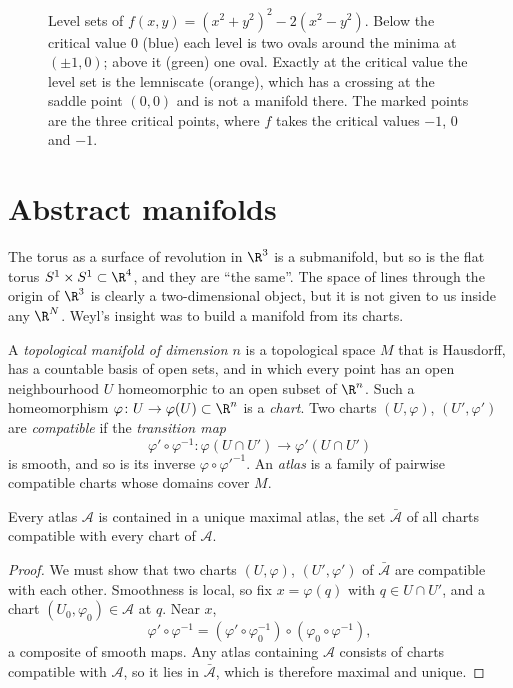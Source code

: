 \begin{figure}[ht]
\centering
{}
\caption{Level sets of $f(x,y)=(x^2+y^2)^2-2(x^2-y^2)$. Below the critical value $0$ (blue) each level is two ovals around the minima at $(\pm1,0)$; above
it (green) one oval. Exactly at the critical value the level set is the lemniscate (orange), which has a crossing at the saddle point $(0,0)$ and is not
a manifold there. The marked points are the three critical points, where $f$ takes the critical values $-1$, $0$ and $-1$.}
\label{fig:cassini}
\end{figure}

\section{Abstract manifolds}\label{sec:abstract}

The torus as a surface of revolution in $\R^3$ is a submanifold, but so is the flat torus $S^1\times S^1\subset\R^4$, and they are ``the same''. The
space of lines through the origin of $\R^3$ is clearly a two-dimensional object, but it is not given to us inside any $\R^N$. Weyl's insight was to
build a manifold from its charts.

\begin{definition}
A \emph{topological manifold of dimension $n$} is a topological space $M$ that is Hausdorff, has a countable basis of open sets, and in which every point
has an open neighbourhood $U$ homeomorphic to an open subset of $\R^n$. Such a homeomorphism $\varphi\colon U\to\varphi(U)\subset\R^n$ is a
\emph{chart}. Two charts $(U,\varphi)$, $(U',\varphi')$ are \emph{compatible} if the \emph{transition map}
\[
\varphi'\circ\varphi^{-1}\colon\varphi(U\cap U')\to\varphi'(U\cap U')
\]
is smooth, and so is its inverse $\varphi\circ\varphi'^{-1}$. An \emph{atlas} is a family of pairwise compatible charts whose domains cover $M$.
\end{definition}

\begin{proposition}\label{prop:maxatlas}
Every atlas $\mathcal A$ is contained in a unique maximal atlas, the set $\bar{\mathcal A}$ of all charts compatible with every chart of $\mathcal A$.
\end{proposition}
\begin{proof}
We must show that two charts $(U,\varphi)$, $(U',\varphi')$ of $\bar{\mathcal A}$ are compatible with each other. Smoothness is local, so fix
$x=\varphi(q)$ with $q\in U\cap U'$, and a chart $(U_0,\varphi_0)\in\mathcal A$ at $q$. Near $x$,
\[
\varphi'\circ\varphi^{-1}=(\varphi'\circ\varphi_0^{-1})\circ(\varphi_0\circ\varphi^{-1}),
\]
a composite of smooth maps. Any atlas containing $\mathcal A$ consists of charts compatible with $\mathcal A$, so it lies in $\bar{\mathcal A}$, which
is therefore maximal and unique.
\end{proof}


